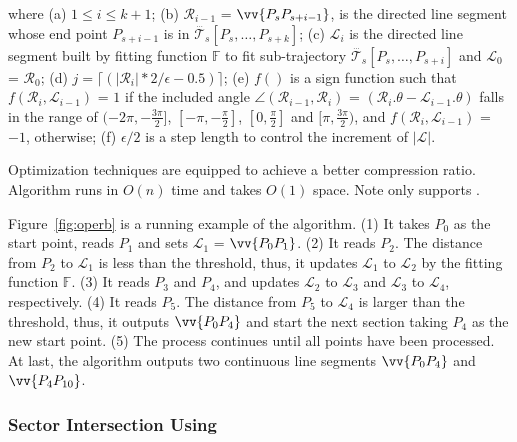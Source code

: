 \ni where (a) $1 \le i \le k+1$; (b) $\mathcal{R}_{i-1}$ = $\vv{P_sP_{s+i-1}}$, is the directed line segment whose end point $P_{s+i-1}$ is in $\dddot{\mathcal{T}_s}[P_s, \ldots, P_{s+k}]$; (c) $\mathcal{L}_{i}$ is the directed line segment built by fitting function $\mathbb{F}$ to fit sub-trajectory $\dddot{\mathcal{T}_s}[P_s, \ldots, P_{s+i}]$ and $\mathcal{L}_{0}$ = $\mathcal{R}_{0}$; (d) $j = \lceil(|\mathcal{R}_{i}|*2/\epsilon - 0.5)\rceil$; (e) $f()$ is a sign function such that $ f(\mathcal{R}_i,\mathcal{L}_{i-1})$ = $1$ if the included angle $\angle(\mathcal{R}_{i-1}, \mathcal{R}_{i})$ = $(\mathcal{R}_i.\theta - \mathcal{L}_{i-1}.\theta)$ falls in the range of $(-2\pi, -\frac{3\pi}{2}]$, $[-\pi, -\frac{\pi}{2}]$, $[0, \frac{\pi}{2}]$ and $[\pi, \frac{3\pi}{2})$, and $f(\mathcal{R}_i,\mathcal{L}_{i-1})$ = $-1$, otherwise; (f) $\epsilon/2$ is a step length to control the increment of $|\mathcal{L}|$.

Optimization techniques are equipped to achieve a better compression ratio\cite{Lin:Operb}.
Algorithm \operb runs in $O(n)$ time and takes $O(1)$ space.
Note \operb only supports \ped.





\begin{example}
	\label{exm-alg-operb}
	Figure~\ref{fig:operb} is a running example of the \operb algorithm.
	(1) It takes $P_0$ as the start point, reads $P_1$ and sets $\mathcal{L}_1$ = $\vv{P_0P_1}$.
	(2) It reads $P_2$. The distance from $P_2$ to $\mathcal{L}_1$ is less than the threshold, thus, it updates $\mathcal{L}_1$  to $\mathcal{L}_2$ by the fitting function $\mathbb{F}$.
	(3) It reads $P_3$ and $P_4$, and updates $\mathcal{L}_2$ to $\mathcal{L}_3$ and $\mathcal{L}_3$ to $\mathcal{L}_4$, respectively.
	(4) It reads $P_5$. The distance from $P_5$ to $\mathcal{L}_4$ is larger than the threshold, thus, it outputs $\vv{P_0P_4}$ and start the next section taking $P_4$ as the new start point.
	(5) The process continues until all points have been processed. At last, the algorithm outputs two continuous line segments $\vv{P_0P_4}$ and $\vv{P_4P_{10}}$.
\end{example}



\subsubsection {Sector Intersection Using \ped}
\label{sec-siped}

